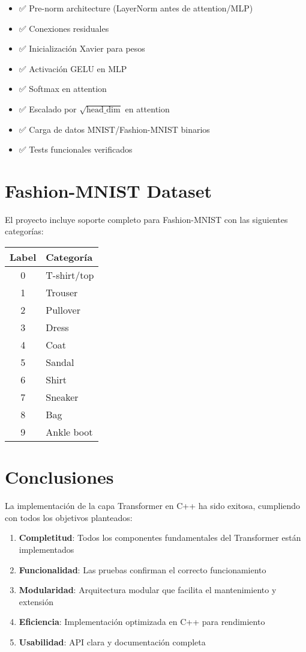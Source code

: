 \documentclass[12pt,a4paper]{article}
\begin{document}
\begin{itemize}
    \item ✅ Pre-norm architecture (LayerNorm antes de attention/MLP)
    \item ✅ Conexiones residuales
    \item ✅ Inicialización Xavier para pesos
    \item ✅ Activación GELU en MLP
    \item ✅ Softmax en attention
    \item ✅ Escalado por $\sqrt{\text{head\_dim}}$ en attention
    \item ✅ Carga de datos MNIST/Fashion-MNIST binarios
    \item ✅ Tests funcionales verificados
\end{itemize}

\section{Fashion-MNIST Dataset}

El proyecto incluye soporte completo para Fashion-MNIST con las siguientes categorías:

\begin{center}
\begin{tabular}{|c|l|}
\hline
\textbf{Label} & \textbf{Categoría} \\
\hline
0 & T-shirt/top \\
1 & Trouser \\
2 & Pullover \\
3 & Dress \\
4 & Coat \\
5 & Sandal \\
6 & Shirt \\
7 & Sneaker \\
8 & Bag \\
9 & Ankle boot \\
\hline
\end{tabular}
\end{center}

\section{Conclusiones}

La implementación de la capa Transformer en C++ ha sido exitosa, cumpliendo con todos los objetivos planteados:

\begin{enumerate}
    \item \textbf{Completitud}: Todos los componentes fundamentales del Transformer están implementados
    \item \textbf{Funcionalidad}: Las pruebas confirman el correcto funcionamiento
    \item \textbf{Modularidad}: Arquitectura modular que facilita el mantenimiento y extensión
    \item \textbf{Eficiencia}: Implementación optimizada en C++ para rendimiento
    \item \textbf{Usabilidad}: API clara y documentación completa
\end{enumerate}
\end{document}
